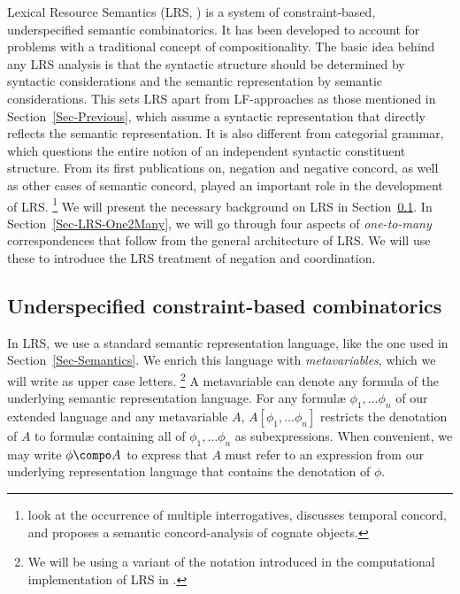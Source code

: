 \documentclass[output=paper]{langsci/langscibook}
\begin{document}
Lexical Resource Semantics (LRS, \citealt{Richter:Sailer:04}) is a system of constraint-based, underspecified semantic combinatorics.
It has been developed to account for problems with a traditional concept of compositionality. 
The basic idea behind any LRS analysis is that the syntactic structure should be determined by syntactic considerations and the semantic representation by semantic considerations. 
This sets LRS apart from LF-approaches as those mentioned in Section~\ref{Sec-Previous}, which assume a syntactic representation that directly reflects the semantic representation. It is also different from categorial grammar, which questions the entire notion of an independent syntactic constituent structure.
From its first publications on, negation and negative concord, as well as other cases of semantic concord, played an important role in the development of LRS.%
\footnote{\citet{Richter:Sailer:01.1} look at the occurrence of multiple interrogatives, 
\citet{Sailer:04.sub} discusses temporal concord, and \citet{Sailer:10} proposes a semantic concord-analysis of cognate objects.
}
We will present the necessary background on LRS in Section~\ref{Sec-LRS-Basics}. 
In Section~\ref{Sec-LRS-One2Many}, we will go through four aspects of \emph{one-to-many} correspondences that follow from the general architecture of LRS. We will use these to introduce the LRS treatment of negation and coordination. 

\subsection{Underspecified constraint-based combinatorics}
\label{Sec-LRS-Basics}

In LRS, we use a standard semantic representation language, like the one used in Section~\ref{Sec-Semantics}. 
We enrich this language with \emph{metavariables}, which we will write as upper case letters.%
\footnote{We will be using a variant of the notation introduced in the computational implementation of LRS in \citet{Penn:Richter:04,Penn:Richter:05}.}
A metavariable can denote any formula of the underlying semantic representation language.
For any formulæ $\phi_1, \ldots \phi_n$ of our extended language and any metavariable $A$, $A[\phi_1, \ldots \phi_n]$ restricts the denotation of $A$ to formulæ containing all of $\phi_1, \ldots \phi_n$ as subexpressions. 
When convenient, we may write $\phi \compo A$ to express that $A$ must refer to an expression from our underlying representation language that contains the denotation of $\phi$.
\end{document}
